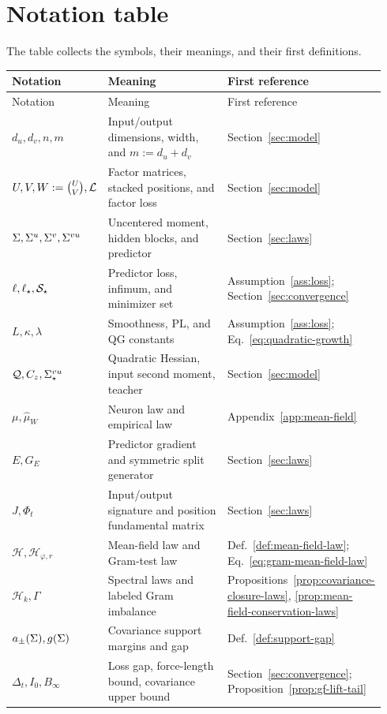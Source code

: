 \clearpage
\section{Notation table}\label{app:notation}
The table collects the symbols, their meanings, and their first definitions.
\begingroup
\small
\renewcommand{\arraystretch}{1.12}
\begin{longtable}{@{}>{\raggedright\arraybackslash}p{0.21\linewidth}
 >{\raggedright\arraybackslash}p{0.53\linewidth}
 >{\raggedright\arraybackslash}p{0.20\linewidth}@{}}
\toprule
Notation & Meaning & First reference\\
\midrule
\endfirsthead
\toprule
Notation & Meaning & First reference\\
\midrule
\endhead
\(d_u,d_v,n,m\)&Input/output dimensions, width, and \(m:=d_u+d_v\)&Section~\ref{sec:model}\\
\(U,V,W:=\binom UV,\mathcal L\)&Factor matrices, stacked positions, and factor loss&Section~\ref{sec:model}\\
\(\Sigma,\Sigma^u,\Sigma^v,\Sigma^{vu}\)&Uncentered moment, hidden blocks, and predictor&Section~\ref{sec:laws}\\
\(\ell,\ell_\star,\mathcal S_\star\)&Predictor loss, infimum, and minimizer set&Assumption~\ref{ass:loss}; Section~\ref{sec:convergence}\\
\(L,\kappa,\lambda\)&Smoothness, PL, and QG constants&Assumption~\ref{ass:loss}; Eq.~\eqref{eq:quadratic-growth}\\
\(\mathcal Q,C_z,\Sigma^{vu}_\star\)&Quadratic Hessian, input second moment, teacher&Section~\ref{sec:model}\\
\(\mu,\widehat\mu_W\)&Neuron law and empirical law&Appendix~\ref{app:mean-field}\\
\(E,G_E\)&Predictor gradient and symmetric split generator&Section~\ref{sec:laws}\\
\(J,\Phi_t\)&Input/output signature and position fundamental matrix&Section~\ref{sec:laws}\\
\(\mathcal H,\mathcal H_{\varphi,r}\)&Mean-field law and Gram-test law&Def.~\ref{def:mean-field-law}; Eq.~\eqref{eq:gram-mean-field-law}\\
\(\mathcal H_k,\Gamma\)&Spectral laws and labeled Gram imbalance&Propositions~\ref{prop:covariance-closure-laws}, \ref{prop:mean-field-conservation-laws}\\
\(a_\pm(\Sigma),g(\Sigma)\)&Covariance support margins and gap&Def.~\ref{def:support-gap}\\
\(\Delta_t,I_0,B_\infty\)&Loss gap, force-length bound, covariance upper bound&Section~\ref{sec:convergence}; Proposition~\ref{prop:gf-lift-tail}\\

\end{longtable}

